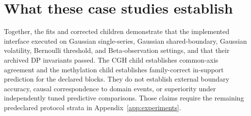 \section{What these case studies establish}
Together, the fits and corrected children demonstrate that the implemented interface executed on Gaussian single-series,
Gaussian shared-boundary, Gaussian volatility, Bernoulli threshold, and Beta-observation settings,
and that their archived DP invariants passed. The CGH child establishes common-axis agreement and
the methylation child establishes family-correct in-support prediction for the declared blocks.
They do not establish external boundary accuracy, causal correspondence to domain events, or
superiority under independently tuned predictive comparisons. Those claims require the remaining
predeclared protocol strata in Appendix~\ref{app:experiments}.
